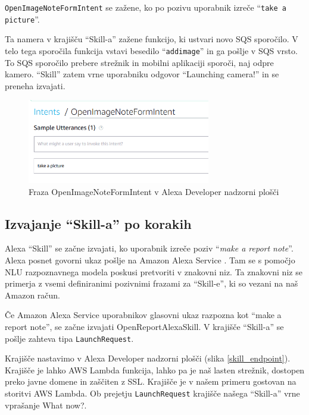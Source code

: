 \documentclass[a4paper, 12pt]{book}
\begin{document}
\texttt{OpenImageNoteFormIntent} se zažene, ko po pozivu uporabnik izreče \enquote{\texttt{take a picture}}.

Ta namera v krajišču \enquote{Skill-a} zažene funkcijo, ki ustvari novo SQS sporočilo.
V telo tega sporočila funkcija vstavi besedilo \enquote{\texttt{addimage}} in ga pošlje v SQS vrsto.
To SQS sporočilo prebere strežnik in mobilni aplikaciji sporoči, naj odpre kamero.
\enquote{Skill} zatem vrne uporabniku odgovor \enquote{Launching camera!} in se preneha izvajati.

\begin{figure}[H]
\begin{center}
\includegraphics[width=8cm]{intent_image}
\end{center}
\caption{Fraza OpenImageNoteFormIntent v Alexa Developer nadzorni plošči}
\label{OpenImageNoteFormIntent}
\end{figure}

\subsection{Izvajanje \enquote{Skill-a} po korakih}

Alexa \enquote{Skill} se začne izvajati, ko uporabnik izreče poziv \enquote{\textit{make a report note}}.
Alexa posnet govorni ukaz pošlje na Amazon Alexa Service \cite{skillexecution}.
Tam se s pomočjo NLU razpoznavnega modela poskusi pretvoriti v znakovni niz.
Ta znakovni niz se primerja z vsemi definiranimi pozivnimi frazami za \enquote{Skill-e}, ki so vezani na naš Amazon račun.

Če Amazon Alexa Service uporabnikov glasovni ukaz razpozna kot \enquote{make a report note}, se začne izvajati OpenReportAlexaSkill.
V krajišče \enquote{Skill-a} se pošlje zahteva tipa \texttt{LaunchRequest}.

Krajišče nastavimo v Alexa Developer nadzorni plošči (slika \ref{skill_endpoint}).
Krajišče je lahko AWS Lambda funkcija, lahko pa je naš lasten strežnik, dostopen preko javne domene in zaščiten z SSL.
Krajišče je v našem primeru gostovan na storitvi AWS Lambda.
Ob prejetju \texttt{LaunchRequest} krajišče našega \enquote{Skill-a} vrne vprašanje What now?.
\end{document}
